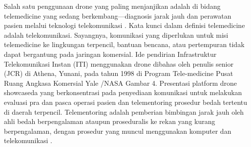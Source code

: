 Salah satu penggunaan drone yang paling menjanjikan adalah di bidang telemedicine yang sedang berkembang—diagnosis jarak jauh dan perawatan pasien melalui teknologi telekomunikasi \citep{breen2010evolutionary}. Kata kunci dalam definisi telemedicine adalah telekomunikasi. Sayangnya, komunikasi yang diperlukan untuk misi telemedicine ke lingkungan terpencil, bantuan bencana, atau pertempuran tidak dapat bergantung pada jaringan komersial. Ide pendirian Infrastruktur Telekomunikasi Instan (ITI) menggunakan drone dibahas oleh penulis senior (JCR) di Athena, Yunani, pada tahun 1998 di Program Tele-medicine Pusat Ruang Angkasa Komersial Yale /NASA Gambar 4. Presentasi platform drone showcaseda yang berkonsentrasi pada penyediaan komunikasi untuk melakukan evaluasi pra dan pasca operasi pasien dan telementoring prosedur bedah tertentu di daerah terpencil. Telementoring adalah pemberian bimbingan jarak jauh oleh ahli bedah berpengalaman ataupun proseduralis ke rekan yang kurang berpengalaman, dengan prosedur yang muncul menggunakan komputer dan telekomunikasi \citep{rosser1997telementoring}. 


